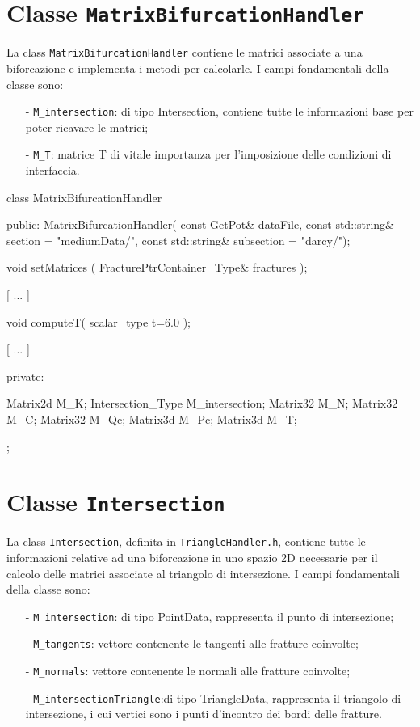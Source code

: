 \section{Classe \texttt{MatrixBifurcationHandler}}
La class \texttt{MatrixBifurcationHandler} contiene le matrici associate a una biforcazione e implementa i metodi per calcolarle. 
I campi fondamentali della classe sono:
	\begin{enumerate}
	\item[-] \texttt{M\_intersection}: di tipo Intersection, contiene tutte le informazioni base per poter ricavare le matrici;
	\item[-] \texttt{M\_T}: matrice T di vitale importanza per l'imposizione delle condizioni di interfaccia.
	\end{enumerate} 
\begin{Code03_03}[caption={Classe \texttt{Intersection}}]
class MatrixBifurcationHandler
{
 public:
	MatrixBifurcationHandler( const GetPot& dataFile,
				const std::string& section = "mediumData/",
				const std::string& subsection = "darcy/");
	
	void setMatrices ( FracturePtrContainer_Type& fractures );
	
	[ ... ]
	
	void computeT( scalar_type t=6.0 );

	[ ... ]

 private:

	Matrix2d M_K;
	Intersection_Type M_intersection;
	Matrix32 M_N;
	Matrix32 M_C;
	Matrix32 M_Qc;
	Matrix3d M_Pc;
	Matrix3d M_T;
};
\end{Code03_03}

\section{Classe \texttt{Intersection}}

La class \texttt{Intersection}, definita in \texttt{TriangleHandler.h}, contiene tutte le informazioni relative ad una biforcazione in uno spazio 2D necessarie per il calcolo delle matrici associate al triangolo di intersezione.
I campi fondamentali della classe sono:
	\begin{enumerate}
	\item[-] \texttt{M\_intersection}: di tipo PointData, rappresenta il punto di intersezione;
	\item[-] \texttt{M\_tangents}: vettore contenente le tangenti alle fratture coinvolte;
	\item[-] \texttt{M\_normals}: vettore contenente le normali alle fratture coinvolte;
	\item[-] \texttt{M\_intersectionTriangle}:di tipo TriangleData, rappresenta il triangolo di intersezione, i cui vertici sono i punti d'incontro dei bordi delle fratture.
	\end{enumerate} 

